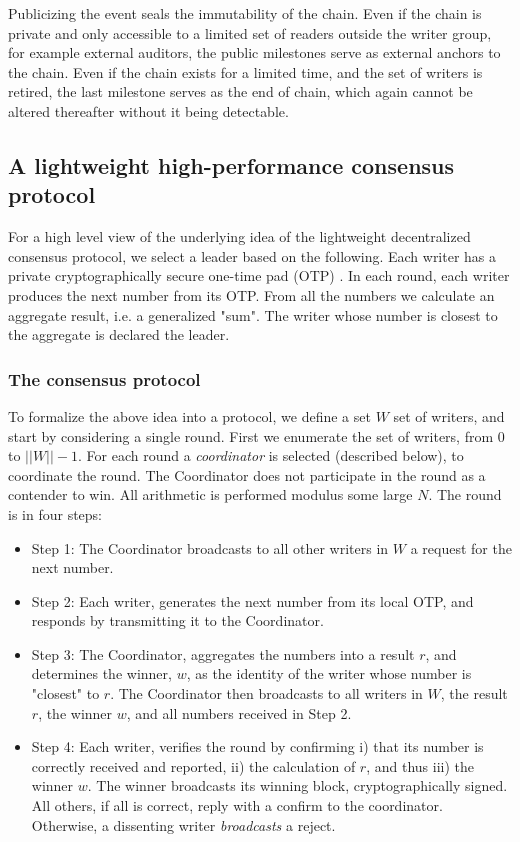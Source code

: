 \documentclass[10pt]{article}
\begin{document}
Publicizing the event seals the immutability of the chain. Even if the chain is private and only accessible to a limited set of readers outside the writer group, for example external auditors, the public milestones serve as external anchors to the chain. Even if the chain exists for a limited time, and the set of writers is retired, the last milestone serves as the end of chain, which again cannot be altered thereafter without it being detectable.

\subsection{A lightweight high-performance consensus protocol}

For a high level view of the underlying idea of the lightweight decentralized 
consensus protocol, we select a leader based on the following. Each writer has a private
cryptographically secure one-time pad (OTP) \cite{Vernam1926}. In each round, each writer 
produces the next number from its  OTP. From all the numbers we calculate 
an aggregate result, i.e. a generalized "sum". The writer whose number is 
closest to the aggregate is declared the leader.


\subsubsection*{The consensus protocol}
To formalize the above idea into a protocol, we define a set $W$ set of writers, and  start by considering a single round. First we enumerate the set of writers, from 0 to $||W|| - 1$. For each round a \emph{coordinator} is selected (described below), to coordinate the round. The Coordinator does not participate in the round as a contender to win. All arithmetic
is performed modulus some large $N$. The round is in four steps:
\begin{itemize}
    \item Step 1: The Coordinator broadcasts to all other writers in $W$ a request for the next number.
    \item Step 2: Each writer, generates the next number from its local OTP, and responds by transmitting it to the Coordinator.
    \item Step 3: The Coordinator, aggregates the numbers into a result $r$, and determines the winner, $w$, as the identity of the writer whose number is "closest" to $r$. The Coordinator then broadcasts to all writers in $W$, the result $r$, the winner $w$, and all numbers received in Step 2.
    \item Step 4: Each writer, verifies the round by confirming i) that its number is correctly received and reported, ii) the calculation of $r$, and thus iii) the winner $w$. The winner broadcasts its winning block, cryptographically signed. All others, if all is correct, reply with a confirm to the coordinator. Otherwise, a dissenting writer \emph{broadcasts} a reject.
\end{itemize}
\end{document}
